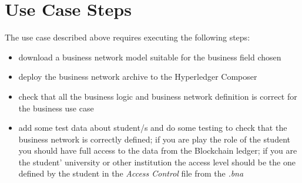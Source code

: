\section{Use Case Steps}
\label{sub-sec:chapter4-section2}
The use case described above requires executing the following steps:
\begin{itemize}
	\item download a business network model suitable for the business field chosen
	\item deploy the business network archive to the Hyperledger Composer
	\item check that all the business logic and  business network definition is correct for the business use case
	\item add some test data about student/s and do some testing to check that the business network is correctly defined; if you are play the role of the student you should have full access to the data from the Blockchain ledger; if you are the student' university or other institution the access level should be the one defined by the student in the \emph{Access Control} file from the \emph{.bna}	
\end{itemize}


